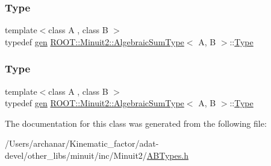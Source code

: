 \mbox{\label{classROOT_1_1Minuit2_1_1AlgebraicSumType_a9bf43a13ee66f334fb43c489c5bfa2e5}} 
\subsubsection{\texorpdfstring{Type}{Type}\hspace{0.1cm}{\footnotesize\ttfamily [2/3]}}
{\footnotesize\ttfamily template$<$class A , class B $>$ \\
typedef \mbox{\hyperlink{classROOT_1_1Minuit2_1_1gen}{gen}} \mbox{\hyperlink{classROOT_1_1Minuit2_1_1AlgebraicSumType}{R\+O\+O\+T\+::\+Minuit2\+::\+Algebraic\+Sum\+Type}}$<$ A, B $>$\+::\mbox{\hyperlink{classROOT_1_1Minuit2_1_1AlgebraicSumType_a9bf43a13ee66f334fb43c489c5bfa2e5}{Type}}}

\mbox{\label{classROOT_1_1Minuit2_1_1AlgebraicSumType_a9bf43a13ee66f334fb43c489c5bfa2e5}} 
\subsubsection{\texorpdfstring{Type}{Type}\hspace{0.1cm}{\footnotesize\ttfamily [3/3]}}
{\footnotesize\ttfamily template$<$class A , class B $>$ \\
typedef \mbox{\hyperlink{classROOT_1_1Minuit2_1_1gen}{gen}} \mbox{\hyperlink{classROOT_1_1Minuit2_1_1AlgebraicSumType}{R\+O\+O\+T\+::\+Minuit2\+::\+Algebraic\+Sum\+Type}}$<$ A, B $>$\+::\mbox{\hyperlink{classROOT_1_1Minuit2_1_1AlgebraicSumType_a9bf43a13ee66f334fb43c489c5bfa2e5}{Type}}}



The documentation for this class was generated from the following file\+:\begin{DoxyCompactItemize}
\item 
/\+Users/archanar/\+Kinematic\+\_\+factor/adat-\/devel/other\+\_\+libs/minuit/inc/\+Minuit2/\mbox{\hyperlink{adat-devel_2other__libs_2minuit_2inc_2Minuit2_2ABTypes_8h}{A\+B\+Types.\+h}}\end{DoxyCompactItemize}
